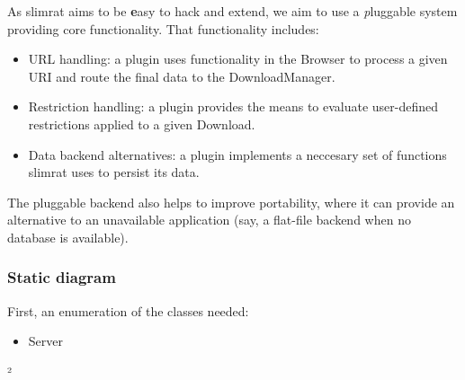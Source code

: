\documentclass{article}
\begin{document}
As slimrat aims to be {\textbf easy to hack and extend}, we aim to use a {\textit pluggable system providing core functionality}. That functionality includes:
\begin{itemize}
\item{URL handling: a plugin uses functionality in the Browser to process a given URI and route the final data to the DownloadManager.}
\item{Restriction handling: a plugin provides the means to evaluate user-defined restrictions applied to a given Download.}
\item{Data backend alternatives: a plugin implements a neccesary set of functions slimrat uses to persist its data.}
\end{itemize}
The pluggable backend also helps to improve portability, where it can provide an alternative to an unavailable application (say, a flat-file backend when no database is available).



\subsubsection{Static diagram}

First, an enumeration of the classes needed:
\begin{itemize}
\item{Server}
\end{itemize}

\begin{comment}
\begin{figure}[hb]
	\umlDiagram[box=,border,sizeX=12cm,sizeY=10cm,ref=diagram]{%
	  \umlClass[reference=Samochod, refpoint=tm, pos=\umlTop{diagram}, posDelta={0,-2}]{Samochod}{%
	      \umlAttribute[visibility=-, type=String]{numerRejestracyjny}
	      \umlAttribute[visibility=-, type=int]{rokProdukcji}
	   }{%
	      \umlMethod[visibility=+, ]{Samochod}{String numer, int rok}
	      \umlMethod[visibility=\$, returntype=float]{obliczSpalanie(float paliwo, float km)}{}
	  }
	  \umlClass[reference=Parking, refpoint=bm, pos=\umlBottom{diagram}, posDelta={0,2}]{Parking}{%
	      \umlAttribute[visibility=-, type=Samochod{$[]$}]{miejsca}
	   }{%
	      \umlMethod[visibility=+, ]{Parking}{int miejsca}
	      \umlMethod[visibility=+, returntype=int]{zaparkuj(Samochod samochod)}{}
	      \umlMethod[visibility=+, returntype=Samochow]{zwolnij}{int miejsce}
	      \umlMethod[visibility=+, returntype=int]{ileWolnychMiejsc}{}
	      \umlMethod[visibility=+, returntype=void]{podglad}{}
	  }
	  \umlAggregation[ref=AB, nodesep=0ex]{Samochod}{Parking}{
	      \umlLabelA{AB}{*}
	      \umlLabelB{AB}{1}
	   }
	}
	\caption{An example class-diagram.}
\end{figure}
\end{comment}²
\end{document}
